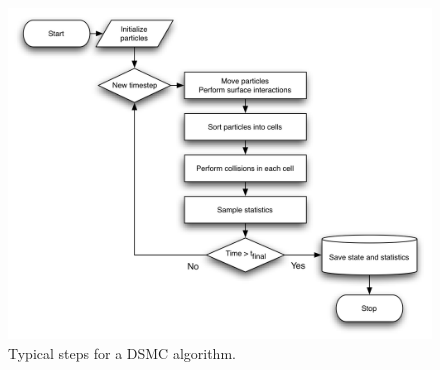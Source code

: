 \begin{figure}[ht]
\begin{center}
\includegraphics[width=\textwidth, trim=0cm 0cm 0cm 0cm, clip]{DSMC/figures/dsmc_flowchart.png}
\end{center}
\caption{Typical steps for a DSMC algorithm.}
\label{fig:dsmc_flowchart}
\end{figure}

